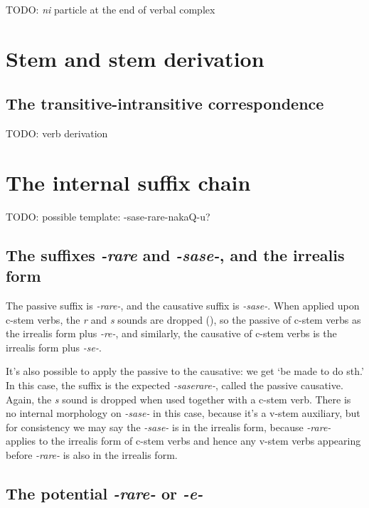 \documentclass[UTF8, a4paper, oneside, scheme=plain]{ctexrep}
\newcommand{\corpus}[1]{\emph{#1}}
\newcommand{\translate}[1]{`#1'}
\begin{document}
TODO: \corpus{ni} particle at the end of verbal complex

\section{Stem and stem derivation}\label{sec:verb-stem}

\subsection{The transitive-intransitive correspondence}

TODO: verb derivation

\section{The internal suffix chain}\label{sec:internal-suffix-chain}

TODO: possible template: -sase-rare-nakaQ-u?

\subsection{The suffixes \corpus{-rare} and \corpus{-sase-}, and the irrealis form}\label{sec:valency-irrealis}

The passive suffix is \corpus{-rare-},
and the causative suffix is \corpus{-sase-}.
When applied upon c-stem verbs,
the \corpus{r} and \corpus{s} sounds are dropped (),
so the passive of c-stem verbs as the irrealis form plus \corpus{-re-},
and similarly,
the causative of c-stem verbs is the irrealis form plus \corpus{-se-}.

It's also possible to apply the passive to the causative:
we get \translate{be made to do sth.}
In this case, the suffix is the expected 
\corpus{-saserare-},
called the passive causative.
Again, the \corpus{s} sound is dropped when used together with a c-stem verb.
There is no internal morphology on \corpus{-sase-} in this case,
because it's a v-stem auxiliary, but for consistency we may say
the \corpus{-sase-} is in the irrealis form,
because \corpus{-rare-} applies to the irrealis form of c-stem verbs 
and hence any v-stem verbs appearing before \corpus{-rare-} is also in the irrealis form.

\subsection{The potential \corpus{-rare-} or \corpus{-e-}}\label{sec:be-able-to-do}
\end{document}
